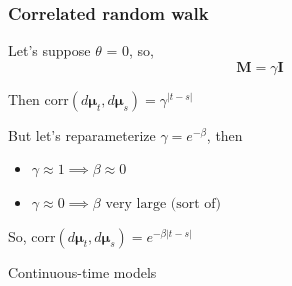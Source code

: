 \documentclass[36pt]{beamer}
\newcommand{\ft}[1]{\frametitle{#1}}
\newcommand{\bmu}{\boldsymbol{\mu}}
\begin{document}

\begin{frame}
\ft{Correlated random walk}
Let's suppose $\theta$ = 0, so,
$$\mathbf{M} = \gamma \mathbf{I}$$
\medskip

Then $\mbox{corr}(d\bmu_t, d\bmu_s) = \gamma^{|t-s|}$
\bigskip

\pause

But let's reparameterize $\gamma = e^{-\beta}$, then 
\begin{itemize}
\item $\gamma \approx 1 \implies \beta \approx 0$ 
\item $\gamma \approx 0 \implies \beta \mbox{ very large (sort of)}$ 
\end{itemize}

So, $\mbox{corr}(d\bmu_t, d\bmu_s) = e^{-\beta|t-s|}$

\end{frame}


{
\begin{frame}[t]
\end{frame}
}


{
\begin{frame}
\textcolor{noaaturq}{\Huge Continuous-time models}
\end{frame}
}
\end{document}
